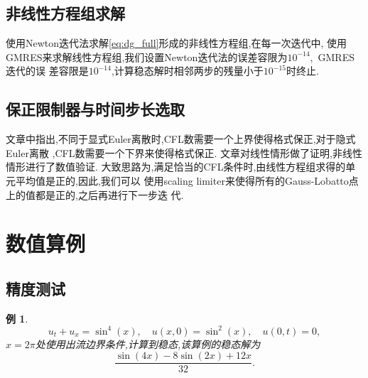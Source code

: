 \documentclass[a4paper, 11pt]{ctexart}
\numberwithin{equation}{section}
\numberwithin{figure}{section}
\newtheorem{example}{例}
\begin{document}
\subsection{非线性方程组求解}
使用Newton迭代法求解\eqref{eq:dg_full}形成的非线性方程组,在每一次迭代中,
使用GMRES来求解线性方程组,我们设置Newton迭代法的误差容限为$10^{-14}$,~GMRES迭代的误
差容限是$10^{-14}$,计算稳态解时相邻两步的残量小于$10^{-15}$时终止.

\subsection{保正限制器与时间步长选取}
文章中指出,不同于显式Euler离散时,CFL数需要一个上界使得格式保正,对于隐式Euler离散
,CFL数需要一个下界来使得格式保正.
文章对线性情形做了证明,非线性情形进行了数值验证.
大致思路为,满足恰当的CFL条件时,由线性方程组求得的单元平均值是正的,因此,我们可以
使用scaling limiter来使得所有的Gauss-Lobatto点上的值都是正的,之后再进行下一步迭
代.

\section{数值算例}
\subsection{精度测试}
\begin{example}\label{ex:1}
\begin{equation}
  u_t+u_x=\sin^4(x),\quad u(x,0)=\sin^2(x),\quad u(0,t)=0,
\end{equation}
$x=2\pi$处使用出流边界条件,计算到稳态,该算例的稳态解为
\begin{equation*}
  \dfrac{\sin(4x)-8\sin(2x)+12x}{32}.
\end{equation*}
\end{example}
\end{document}
